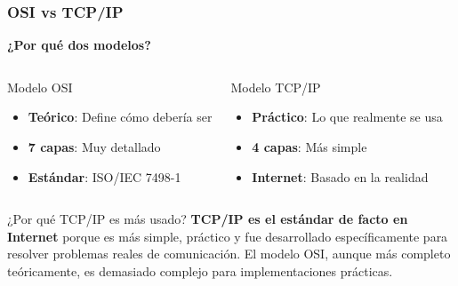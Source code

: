 \documentclass[aspectratio=169]{beamer}
\begin{document}
            \begin{frame}
            \frametitle{OSI vs TCP/IP}
            
            \begin{center}
            \Large \textbf{¿Por qué dos modelos?}
            \end{center}
            
            \begin{columns}
            \begin{block}{Modelo OSI}
            \begin{itemize}
            \item \textbf{Teórico}: Define cómo debería ser
            \item \textbf{7 capas}: Muy detallado
            \item \textbf{Estándar}: ISO/IEC 7498-1
            \end{itemize}
            \end{block}
            
            \begin{block}{Modelo TCP/IP}
            \begin{itemize}
            \item \textbf{Práctico}: Lo que realmente se usa
            \item \textbf{4 capas}: Más simple
            \item \textbf{Internet}: Basado en la realidad
            \end{itemize}
            \end{block}
            \end{columns}
            
            
            \begin{block}{¿Por qué TCP/IP es más usado?}
            \textbf{TCP/IP es el estándar de facto en Internet} porque es más 
            simple, práctico y fue desarrollado específicamente para resolver 
            problemas reales de comunicación. El modelo OSI, aunque más 
            completo teóricamente, es demasiado complejo para implementaciones 
            prácticas.
            \end{block}
            \end{frame}
\end{document}
